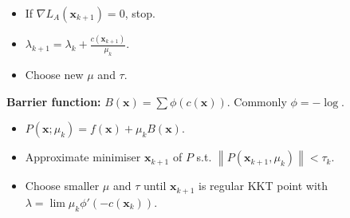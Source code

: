 \documentclass[12pt]{article}
\newcommand{\norm}[1]{\left\lVert#1\right\rVert}
\begin{document}
\begin{multicols*}{3}
\begin{itemize}
            \item If $\nabla L_A(\bm{x}_{k + 1}) = 0$, stop.
            \item $\lambda_{k + 1} = \lambda_k + \frac{c(\bm{x}_{k + 1})}{\mu_k}$.
            \item Choose new $\mu$ and $\tau$.
        \end{itemize}
        \textbf{Barrier function:} $B(\bm{x}) = \sum\phi(c(\bm{x}))$. Commonly $\phi = -\log$.
        \begin{itemize}
            \item $P(\bm{x}; \mu_k) = f(\bm{x}) + \mu_kB(\bm{x})$.
            \item Approximate minimiser $\bm{x}_{k + 1}$ of $P$ s.t. $\norm{P(\bm{x}_{k + 1}, \mu_k)} < \tau_k$.
            \item Choose smaller $\mu$ and $\tau$ until $\bm{x}_{k + 1}$ is regular KKT point with $\lambda = \lim \mu_k\phi'(-c(\bm{x}_k))$.
        \end{itemize}
    \end{multicols*}
\end{document}
